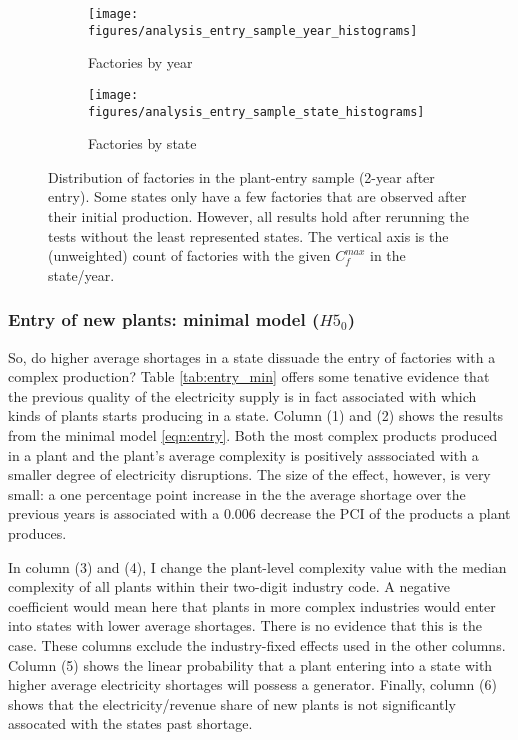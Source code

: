 \documentclass[11pt]{article}
\begin{document}
\begin{figure}
     \centering
     \begin{subfigure}[b]{0.45\textwidth}
         \centering
         \texttt{[image: figures/analysis\_entry\_sample\_year\_histograms]}
	 \caption{Factories by year}
         \label{fig:entry_by_year}
     \end{subfigure}
     \hfill
     \begin{subfigure}[b]{0.45\textwidth}
         \centering
         \texttt{[image: figures/analysis\_entry\_sample\_state\_histograms]}
	 \caption{Factories by state}
         \label{fig:entry_by_state}
     \end{subfigure}
     \caption[Distribution of new factories by state and year]{Distribution of factories in the plant-entry sample (2-year after entry). Some states only have a few factories that are observed after their initial production. However, all results hold after rerunning the tests without the least represented states. The vertical axis is the (unweighted) count of factories with the given $C^{max}_{f}$ in the state/year.}
        \label{fig:new_entry_sample}
\end{figure}

\subsubsection{Entry of new plants: minimal model ($H5_0$)}

So, do higher average shortages in a state dissuade the entry of factories with a complex production? Table \ref{tab:entry_min} offers some tenative evidence that the previous quality of the electricity supply is in fact associated with which kinds of plants starts producing in a state. Column (1) and (2) shows the results from the minimal model \ref{eqn:entry}. Both the most complex products produced in a plant and the plant's average complexity is positively asssociated with a smaller degree of electricity disruptions. The size of the effect, however, is very small: a one percentage point increase in the the average shortage over the previous years is associated with a 0.006 decrease the PCI of the products a plant produces.

In column (3) and (4), I change the plant-level complexity value with the median complexity of all plants within their two-digit industry code. A negative coefficient would mean here that plants in more complex industries would enter into states with lower average shortages. There is no evidence that this is the case. These columns exclude the industry-fixed effects used in the other columns. Column (5) shows the linear probability that a plant entering into a state with higher average electricity shortages will possess a generator. Finally, column (6) shows that the electricity/revenue share of new plants is not significantly assocated with the states past shortage.
\end{document}
